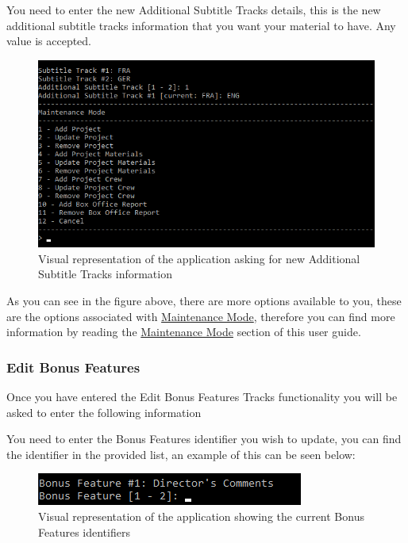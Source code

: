 \documentclass[
  english,
  a4paper,
,tablecaptionabove
]{scrartcl}
\begin{document}
You need to enter the new Additional Subtitle Tracks details, this is
the new additional subtitle tracks information that you want your
material to have. Any value is accepted.

\begin{figure}
\centering
\includegraphics{images/user-guide/maintenance-mode/update-project-material-additional-subtitle-tracks.png}
\caption{Visual representation of the application asking for new
Additional Subtitle Tracks information}
\end{figure}

As you can see in the figure above, there are more options available to
you, these are the options associated with
\protect\hyperlink{using-maintenance-mode}{Maintenance Mode}, therefore
you can find more information by reading the
\protect\hyperlink{using-maintenance-mode}{Maintenance Mode} section of
this user guide.

\newpage

\hypertarget{edit-bonus-features-1}{%
\subsubsection{Edit Bonus Features}\label{edit-bonus-features-1}}

Once you have entered the Edit Bonus Features Tracks functionality you
will be asked to enter the following information

You need to enter the Bonus Features identifier you wish to update, you
can find the identifier in the provided list, an example of this can be
seen below:

\begin{figure}
\centering
\includegraphics{images/user-guide/maintenance-mode/update-project-material-bonus-feature-select-id.png}
\caption{Visual representation of the application showing the current
Bonus Features identifiers}
\end{figure}
\end{document}

